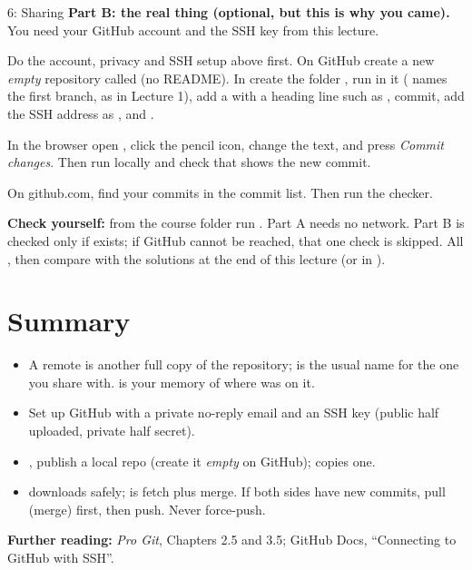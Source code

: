 \begin{homework}{6: Sharing}
\textbf{Part B: the real thing (optional, but this is why you came).} You need your GitHub account and the SSH key from this lecture.
\begin{description}[leftmargin=1.2em,style=nextline]
\item[6.8 Create and push] Do the account, privacy and SSH setup above first. On GitHub create a new \emph{empty} repository called  (no README). In  create the folder , run  in it ( names the first branch, as in Lecture 1), add a  with a heading line such as , commit, add the SSH address as , and .
\item[6.9 Edit on GitHub, then pull] In the browser open , click the pencil icon, change the text, and press \emph{Commit changes}. Then run  locally and check that  shows the new commit.
\item[6.10 Look, then check] On github.com, find your commits in the commit list. Then run the checker.
\end{description}

\textbf{Check yourself:} from the course folder run . Part A needs no network. Part B is checked only if  exists; if GitHub cannot be reached, that one check is skipped. All , then compare with the solutions at the end of this lecture (or in ).
\end{homework}

\section{Summary}

\begin{itemize}
  \item A remote is another full copy of the repository;  is the usual name for the one you share with.  is your memory of where  was on it.
  \item Set up GitHub with a private no-reply email and an SSH key (public half uploaded, private half secret).
  \item {},  publish a local repo (create it \emph{empty} on GitHub);  copies one.
  \item {} downloads safely;  is fetch plus merge. If both sides have new commits, pull (merge) first, then push. Never force-push.
\end{itemize}

\textbf{Further reading:} \emph{Pro Git}, Chapters 2.5 and 3.5; GitHub Docs, ``Connecting to GitHub with SSH''.

\solutionspage




